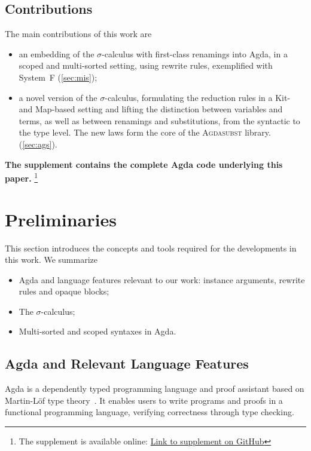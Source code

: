 \documentclass[screen,nonacm]{acmart}
\begin{document}
\subsection*{Contributions}
The main contributions of this work are
\begin{itemize}
      \item an embedding of the $σ$-calculus with first-class renamings into Agda, in a
            scoped and multi-sorted setting, using rewrite rules, exemplified with System~F
            (\cref{sec:mis});
      \item a novel version of the $σ$-calculus, formulating the reduction rules in a Kit-
            and Map-based setting and lifting the distinction between variables and terms,
            as well as between renamings and substitutions, from the syntactic to the type
            level. The new laws form the core of the \textsc{Agdasubst} library.
            (\cref{sec:ags}).
\end{itemize}

\noindent\textbf{The supplement contains the complete Agda code underlying this paper.}
\footnote{The supplement is available online:
      \href{https://github.com/Mari-W/Agdasubst}{Link to supplement on GitHub}}

\section{Preliminaries}\label{sec:pre}
This section introduces the concepts and tools required for the developments in
this work. We summarize
\begin{itemize}
      \item Agda and language features relevant to our work: instance arguments, rewrite
            rules and opaque blocks;
      \item The $σ$-calculus;
      \item Multi-sorted and scoped syntaxes in Agda.
\end{itemize}

\subsection{Agda and Relevant Language Features}\label{sec:pre-agd}
Agda is a dependently typed programming language and proof assistant based on
Martin-Löf type theory~\cite{MARTINLOF197573}. It enables users to write
programs and proofs in a functional programming language, verifying correctness
through type checking.
\end{document}
